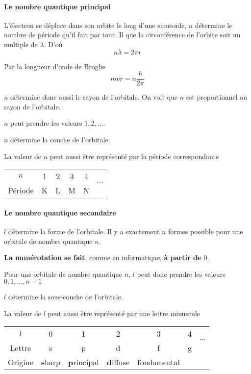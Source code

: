 \documentclass[11pt,a4paper,french]{article}
\begin{document}
\paragraph{Le nombre quantique principal}
L'électron se déplace dans son orbite le long d'une sinusoïde, $n$ détermine le nombre de période qu'il fait par tour.
Il que la circonférence de l'orbite soit un multiple de $\lambda$. D'où
\[ n\lambda = 2\pi r \]

Par la longueur d'onde de Broglie
\[ m \nu r = n \frac{h}{2\pi} \]

$n$ détermine donc aussi le rayon de l'orbitale. On voit que $n$ est proportionnel au rayon de l'orbitale.

$n$ peut prendre les valeurs $1, 2, \ldots$.

$n$ détermine la couche de l'orbitale.

La valeur de $n$ peut aussi être représenté par la période correspondante

\begin{center}
	\begin{tabular}{c|ccccc}
		$n$ & 1 & 2 & 3 & 4 & \multirow{2}{*}{$\cdots$}\\
		\cline{1-5}
		Période & K & L & M & N
	\end{tabular}
\end{center}

\paragraph{Le nombre quantique secondaire}
$l$ détermine la forme de l'orbitale.
Il y a exactement $n$ formes possible pour une orbitale de nombre quantique $n$.

{\bf La numérotation se fait}, comme en informatique, {\bf à partir de $0$}.

Pour une orbitale de nombre quantique $n$, $l$ peut donc prendre les valeurs $0, 1, \ldots, n-1$

$l$ détermine la sous-couche de l'orbitale.

La valeur de $l$ peut aussi être représenté par une lettre minuscule

\begin{center}
	\begin{tabular}{c|cccccc}
		$l$ & 0 & 1 & 2 & 3 & 4 & \multirow{2}{*}{$\cdots$}\\
		\cline{1-6}
		Lettre & s & p & d & f & g\\
		Origine & {\bf s}harp & {\bf p}rincipal & {\bf d}iffuse & {\bf f}ondamental
	\end{tabular}
\end{center}
\end{document}

